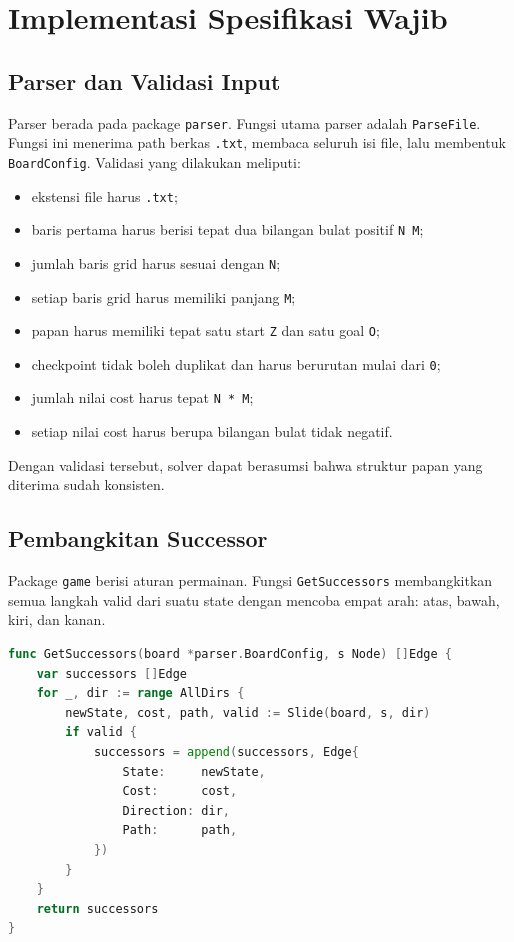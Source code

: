 \section{Implementasi Spesifikasi Wajib}\label{sec:Implementasi Spesifikasi Wajib}

\subsection{Parser dan Validasi Input}\label{sub:Parser dan Validasi Input}

Parser berada pada package \texttt{parser}. Fungsi utama parser adalah
\texttt{ParseFile}. Fungsi ini menerima path berkas \texttt{.txt},
membaca seluruh isi file, lalu membentuk \texttt{BoardConfig}. Validasi
yang dilakukan meliputi:
\begin{itemize}[label=\textbullet]
    \item ekstensi file harus \texttt{.txt};
    \item baris pertama harus berisi tepat dua bilangan bulat positif
        \texttt{N M};
    \item jumlah baris grid harus sesuai dengan \texttt{N};
    \item setiap baris grid harus memiliki panjang \texttt{M};
    \item papan harus memiliki tepat satu start \texttt{Z} dan satu
        goal \texttt{O};
    \item checkpoint tidak boleh duplikat dan harus berurutan mulai
        dari \texttt{0};
    \item jumlah nilai cost harus tepat \texttt{N * M};
    \item setiap nilai cost harus berupa bilangan bulat tidak negatif.
\end{itemize}

Dengan validasi tersebut, solver dapat berasumsi bahwa struktur papan
yang diterima sudah konsisten.

\subsection{Pembangkitan Successor}\label{sub:Pembangkitan Successor}

Package \texttt{game} berisi aturan permainan. Fungsi
\texttt{GetSuccessors} membangkitkan semua langkah valid dari suatu
state dengan mencoba empat arah: atas, bawah, kiri, dan kanan.

\begin{lstlisting}[language=Go, basicstyle=\ttfamily\small, breaklines=true]
func GetSuccessors(board *parser.BoardConfig, s Node) []Edge {
    var successors []Edge
    for _, dir := range AllDirs {
        newState, cost, path, valid := Slide(board, s, dir)
        if valid {
            successors = append(successors, Edge{
                State:     newState,
                Cost:      cost,
                Direction: dir,
                Path:      path,
            })
        }
    }
    return successors
}
\end{lstlisting}

